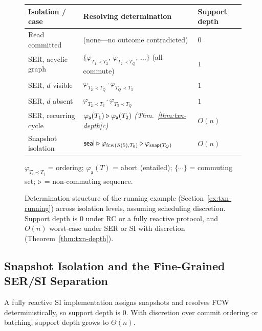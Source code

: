 \begin{figure}[t]
  \centering
  \footnotesize
  \setlength{\tabcolsep}{4pt}
  \renewcommand{\arraystretch}{1.15}
  \begin{tabular}{@{}lll@{}}
    \toprule
    \textbf{Isolation / case} & \textbf{Resolving determination} & \textbf{Support depth} \\
    \midrule
    Read committed &
    (none---no outcome contradicted) & $0$ \\
    SER, acyclic graph &
    $\{\varphi_{T_1 \prec T_2},\, \varphi_{T_2 \prec T_Q},\, \ldots\}$ (all commute) & $1$ \\
    SER, $d$ visible &
    $\varphi_{T_2 \prec T_Q} \cdot \varphi_{T_Q \prec T_3}$ & $1$ \\
    SER, $d$ absent &
    $\varphi_{T_2 \prec T_3} \cdot \varphi_{T_3 \prec T_Q}$ & $1$ \\
    SER, recurring cycle &
    $\varphi_{\mathsf{a}}(T_1) \mathbin{\triangleright} \varphi_{\mathsf{a}}(T_2)$
    \;\emph{(Thm.~\ref{thm:txn-depth}c)} & $O(n)$ \\
    Snapshot isolation &
    $\mathsf{seal} \mathbin{\triangleright} \varphi_{\mathrm{fcw}(S(5),T_6)}
      \mathbin{\triangleright} \varphi_{\mathsf{snap}(T_Q)}$ & $O(n)$ \\
    \bottomrule
  \end{tabular}
  \smallskip
  {\footnotesize
    $\varphi_{T_i \prec T_j}$ = ordering;\;
    $\varphi_{\mathsf{a}}(T)$ = abort (entailed);\;
    $\{\cdots\}$ = commuting set;\;
    $\mathbin{\triangleright}$ = non-commuting sequence.}
  \caption{Determination structure of the running example
    (Section~\ref{ex:txn-running}) across isolation levels, assuming scheduling
    discretion. Support depth is $0$ under RC or a fully reactive protocol, and
    $O(n)$ worst-case under SER or SI with discretion
    (Theorem~\ref{thm:txn-depth}).}
  \label{fig:det-tables}
\end{figure}

\subsection{Snapshot Isolation and the Fine-Grained SER/SI Separation}
\label{sec:txn-si}

A fully reactive SI implementation assigns snapshots and resolves FCW
deterministically, so support depth is $0$. With discretion over commit ordering
or batching, support depth grows to $\Theta(n)$.

